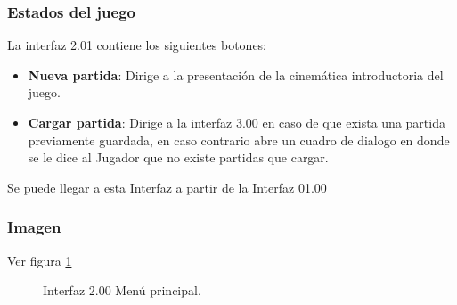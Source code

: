 \documentclass[11pt,letterpaper]{article}
\begin{document}
	\subsubsection{Estados del juego}
La interfaz 2.01 contiene los siguientes botones:
\begin{itemize}
	\item \textbf{Nueva partida}:  Dirige a la presentación de la cinemática introductoria del juego.
	\item \textbf{Cargar partida}: Dirige a la interfaz 3.00 en caso de que exista una partida previamente guardada, en caso contrario abre un cuadro de dialogo en donde se le dice al Jugador que no existe partidas que cargar.
\end{itemize}
Se puede llegar a esta Interfaz a partir de la Interfaz 01.00 
	\subsubsection{Imagen}
Ver figura \ref{fig:PMenuP}
\begin{figure}
  \centering
   
 	
  \caption{Interfaz 2.00 Menú principal.}
  \label{fig:PMenuP}
\end{figure} 
 
\end{document}
